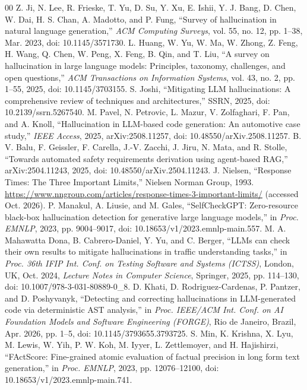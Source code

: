 \documentclass[conference,a4paper]{IEEEtran}
\begin{document}
\begin{thebibliography}{00}
\scriptsize
{} Z. Ji, N. Lee, R. Frieske, T. Yu, D. Su, Y. Xu, E. Ishii, Y. J. Bang, D. Chen, W. Dai, H. S. Chan, A. Madotto, and P. Fung, ``Survey of hallucination in natural language generation,'' \emph{ACM Computing Surveys}, vol. 55, no. 12, pp. 1--38, Mar. 2023, doi: 10.1145/3571730.
 L. Huang, W. Yu, W. Ma, W. Zhong, Z. Feng, H. Wang, Q. Chen, W. Peng, X. Feng, B. Qin, and T. Liu, ``A survey on hallucination in large language models: Principles, taxonomy, challenges, and open questions,'' \emph{ACM Transactions on Information Systems}, vol. 43, no. 2, pp. 1--55, 2025, doi: 10.1145/3703155.
 S. Joshi, ``Mitigating LLM hallucinations: A comprehensive review of techniques and architectures,'' SSRN, 2025, doi: 10.2139/ssrn.5267540.
 M. Pavel, N. Petrovic, L. Mazur, V. Zolfaghari, F. Pan, and A. Knoll, ``Hallucination in LLM-based code generation: An automotive case study,'' \emph{IEEE Access}, 2025, arXiv:2508.11257, doi: 10.48550/arXiv.2508.11257.
 B. V. Balu, F. Geissler, F. Carella, J.-V. Zacchi, J. Jiru, N. Mata, and R. Stolle, ``Towards automated safety requirements derivation using agent-based RAG,'' arXiv:2504.11243, 2025, doi: 10.48550/arXiv.2504.11243.
 J. Nielsen, ``Response Times: The Three Important Limits,'' Nielsen Norman Group, 1993. \url{https://www.nngroup.com/articles/response-times-3-important-limits/} (accessed Oct. 2026).
 P. Manakul, A. Liusie, and M. Gales, ``SelfCheckGPT: Zero-resource black-box hallucination detection for generative large language models,'' in \emph{Proc. EMNLP}, 2023, pp. 9004--9017, doi: 10.18653/v1/2023.emnlp-main.557.
 M. A. Mahawatta Dona, B. Cabrero-Daniel, Y. Yu, and C. Berger, ``LLMs can check their own results to mitigate hallucinations in traffic understanding tasks,'' in \emph{Proc. 36th IFIP Int. Conf. on Testing Software and Systems (ICTSS)}, London, UK, Oct. 2024, \emph{Lecture Notes in Computer Science}, Springer, 2025, pp. 114--130, doi: 10.1007/978-3-031-80889-0\_8.
 D. Khati, D. Rodriguez-Cardenas, P. Pantzer, and D. Poshyvanyk, ``Detecting and correcting hallucinations in LLM-generated code via deterministic AST analysis,'' in \emph{Proc. IEEE/ACM Int. Conf. on AI Foundation Models and Software Engineering (FORGE)}, Rio de Janeiro, Brazil, Apr. 2026, pp. 1--5, doi: 10.1145/3793655.3793725.
 S. Min, K. Krishna, X. Lyu, M. Lewis, W. Yih, P. W. Koh, M. Iyyer, L. Zettlemoyer, and H. Hajishirzi, ``FActScore: Fine-grained atomic evaluation of factual precision in long form text generation,'' in \emph{Proc. EMNLP}, 2023, pp. 12076--12100, doi: 10.18653/v1/2023.emnlp-main.741.

\end{thebibliography}
\end{document}
